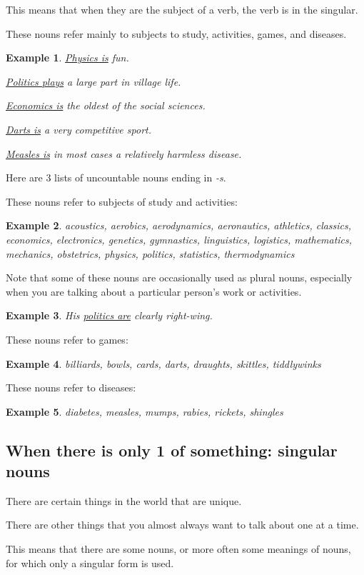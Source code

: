 \documentclass[oneside]{book}
\numberwithin{equation}{section}
\newtheorem{example}{Example}[section]
\begin{document}
This means that when they are the subject of a verb, the verb is in the singular.

%
These nouns refer mainly to subjects to study, activities, games, and diseases.
\begin{example}
    \underline{Physics is} fun.
    
    \underline{Politics plays} a large part in village life.
    
    \underline{Economics is} the oldest of the social sciences.
    
    \underline{Darts is} a very competitive sport.
    
    \underline{Measles is} in most cases a relatively harmless disease.
\end{example}
Here are 3 lists of uncountable nouns ending in \textit{-s}.

%
These nouns refer to subjects of study and activities:
\begin{example}
    acoustics, aerobics, aerodynamics, aeronautics, athletics, classics, economics, electronics, genetics, gymnastics, linguistics, logistics, mathematics, mechanics, obstetrics, physics, politics, statistics, thermodynamics
\end{example}
Note that some of these nouns are occasionally used as plural nouns, especially when you are talking about a particular person's work or activities.
\begin{example}
    His \underline{politics are} clearly right-wing.
\end{example}
These nouns refer to games:
\begin{example}
    billiards, bowls, cards, darts, draughts, skittles, tiddlywinks
\end{example}
These nouns refer to diseases:
\begin{example}
    diabetes, measles, mumps, rabies, rickets, shingles
\end{example}

\subsection{When there is only 1 of something: singular nouns}
%
\noindent{} There are certain things in the world that are unique.

There are other things that you almost always want to talk about one at a time.

This means that there are some nouns, or more often some meanings of nouns, for which only a singular form is used.
\end{document}
